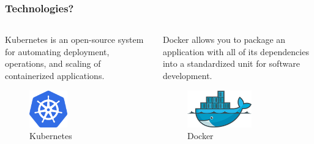 		\begin{frame}
			\frametitle{Technologies?}
			\begin{columns}
        \begin{column}{0.48\textwidth}
					\begin{block}{Kubernetes}
    				 is an open-source system for automating deployment, operations, and scaling of containerized applications. \cite{kubernetesio}
    			\begin{figure}[htb]
    				\begin{center}
    					\includegraphics[height=60px]{img/kubernetes-logo.png}
    					  \caption{Kubernetes \cite{kubernetes-logo}}
    				\end{center}
    			\end{figure}
    			\end{block}
        \end{column}
        \begin{column}{0.48\textwidth}
          \begin{block}{Docker}
		  		  allows you to package an application with all of its dependencies into a standardized unit for software development. \cite{dockerio-whatisdocker}
            \begin{figure}[htb]
    				  \begin{center}
    					  \includegraphics[height=60px]{img/docker-logo.png}
    					  \caption{Docker \cite{docker-logo}}
    				  \end{center}
    			  \end{figure}
			    \end{block}
        \end{column}
      \end{columns}
		\end{frame}
    
